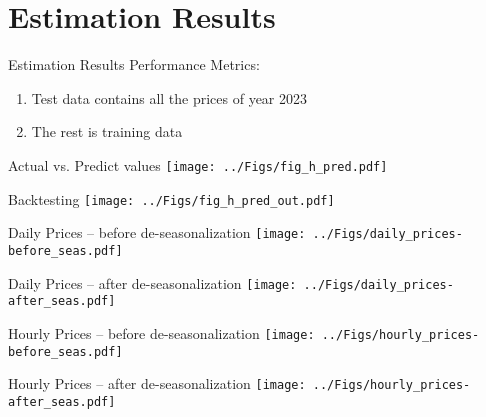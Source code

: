 \documentclass{beamer}
\begin{document}
\section{Estimation Results}

\begin{frame}{Estimation Results}
    Performance Metrics:

    \begin{center}
        
    \end{center}

    \vspace*{0.5cm}

    \begin{enumerate}[label=$\bullet$]
        \item Test data contains all the prices of year 2023
        \item The rest is training data
    \end{enumerate}
\end{frame}


\begin{frame}{Actual vs. Predict values}
    \texttt{[image: ../Figs/fig\_h\_pred.pdf]}
\end{frame}


\begin{frame}{Backtesting}
    \texttt{[image: ../Figs/fig\_h\_pred\_out.pdf]}
\end{frame}


\begin{frame}{Daily Prices -- before de-seasonalization}
    \texttt{[image: ../Figs/daily\_prices-before\_seas.pdf]}
\end{frame}


\begin{frame}{Daily Prices -- after de-seasonalization}
    \texttt{[image: ../Figs/daily\_prices-after\_seas.pdf]}
\end{frame}


\begin{frame}{Hourly Prices -- before de-seasonalization}
    \texttt{[image: ../Figs/hourly\_prices-before\_seas.pdf]}
\end{frame}


\begin{frame}{Hourly Prices -- after de-seasonalization}
    \texttt{[image: ../Figs/hourly\_prices-after\_seas.pdf]}
\end{frame}
\end{document}
